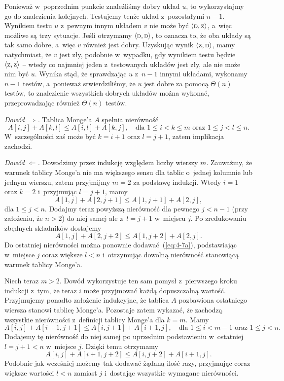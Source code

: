 Ponieważ w~poprzednim punkcie znaleźliśmy dobry układ $u$, to wykorzystajmy go do znalezienia kolejnych. Testujemy tenże układ z~pozostałymi $n-1$. Wynikiem testu $u$ z~pewnym innym układem $v$ nie może być $\langle{\scriptstyle\rm D},{\scriptstyle\rm Z}\rangle$, a~więc możliwe są trzy sytuacje. Jeśli otrzymamy $\langle{\scriptstyle\rm D},{\scriptstyle\rm D}\rangle$, to oznacza to, że oba układy są tak samo dobre, a~więc $v$ również jest dobry. Uzyskując wynik $\langle{\scriptstyle\rm Z},{\scriptstyle\rm D}\rangle$, mamy natychmiast, że $v$ jest zły, podobnie w~wypadku, gdy wynikiem testu będzie $\langle{\scriptstyle\rm Z},{\scriptstyle\rm Z}\rangle$ -- wtedy co najmniej jeden z~testowanych układów jest zły, ale nie może nim być $u$. Wynika stąd, że sprawdzając $u$ z~$n-1$ innymi układami, wykonamy $n-1$ testów, a~ponieważ stwierdziliśmy, że $u$ jest dobre za pomocą $\Theta(n)$ testów, to znalezienie wszystkich dobrych układów można wykonać, przeprowadzając również $\Theta(n)$ testów.


\subproblem %
\noindent\emph{Dowód $\Rightarrow$.} Tablica Monge'a $A$ spełnia nierówność
\[
	A[i,j]+A[k,l] \le A[i,l]+A[k,j], \quad\text{dla $1\le i<k\le m$ oraz $1\le j<l\le n$}.
\]
W~szczególności zaś może być $k=i+1$ oraz $l=j+1$, zatem implikacja zachodzi.
\bigskip

\noindent\emph{Dowód $\Leftarrow$.} Dowodzimy przez indukcję względem liczby wierszy $m$. Zauważmy, że warunek tablicy Monge'a nie ma większego sensu dla tablic o~jednej kolumnie lub jednym wierszu, zatem przyjmijmy $m=2$ za podstawę indukcji. Wtedy $i=1$ oraz $k=2$ i~przyjmując $l=j+1$, mamy
\[
	A[1,j]+A[2,j+1] \le A[1,j+1]+A[2,j], \tag{$*$}\label{eq:4-7a}
\]
dla $1\le j<n$. Dodajmy teraz powyższą nierówność dla pewnego $j<n-1$ (przy założeniu, że $n>2$) do niej samej ale z~$l=j+1$ w~miejscu $j$. Po zredukowaniu zbędnych składników dostajemy
\[
	A[1,j]+A[2,j+2] \le A[1,j+2]+A[2,j].
\]
Do ostatniej nierówności można ponownie dodawać~(\ref{eq:4-7a}), podstawiając w~miejsce $j$ coraz większe $l<n$ i~otrzymując dowolną nierówność stanowiącą warunek tablicy Monge'a.

Niech teraz $m>2$. Dowód wykorzystuje ten sam pomysł z~pierwszego kroku indukcji z~tym, że teraz $i$ może przyjmować każdą dopuszczalną wartość. Przyjmujemy ponadto założenie indukcyjne, że tablica $A$ pozbawiona ostatniego wiersza stanowi tablicę Monge'a. Pozostaje zatem wykazać, że zachodzą wszystkie nierówności z~definicji tablicy Monge'a dla $k=m$. Mamy
\[
	A[i,j]+A[i+1,j+1] \le A[i,j+1]+A[i+1,j], \quad\text{dla $1\le i<m-1$ oraz $1\le j<n$}.
\]
Dodajemy tę nierówność do niej samej po uprzednim podstawieniu w~ostatniej $l=j+1<n$ w~miejsce $j$. Dzięki temu otrzymamy
\[
	A[i,j]+A[i+1,j+2] \le A[i,j+2]+A[i+1,j].
\]
Podobnie jak wcześniej możemy tak dodawać żądaną ilość razy, przyjmując coraz większe wartości $l<n$ zamiast $j$ i~dostając wszystkie wymagane nierówności.

